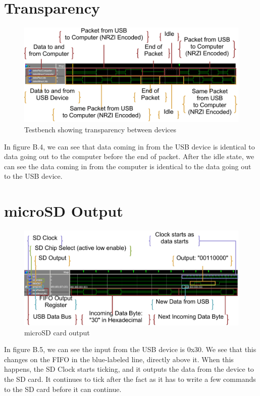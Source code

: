 \documentclass[12pt,letter,oneside]{report}
\begin{document}
\section{Transparency}
\begin{figure}[h!]
	\centering
	\caption{Testbench showing transparency between devices}
	\includegraphics[width=.98\textwidth]{transparency}
\end{figure}
In figure B.4, we can see that data coming in from the USB device is identical to data going out to the computer before the end of packet. After the idle state, we can see the data coming in from the computer is identical to the data going out to the USB device.
\pagebreak
\section{microSD Output}
\begin{figure}[h!]
	\centering
	\caption{microSD card output}
	\includegraphics[width=.98\textwidth]{outputToMicroSD}
\end{figure}
In figure B.5, we can see the input from the USB device is 0x30. We see that this changes on the FIFO in the blue-labeled line, directly above it. When this happens, the SD Clock starts ticking, and it outputs the data from the device to the SD card. It continues to tick after the fact as it has to write a few commands to the SD card before it can continue.
\end{document}

